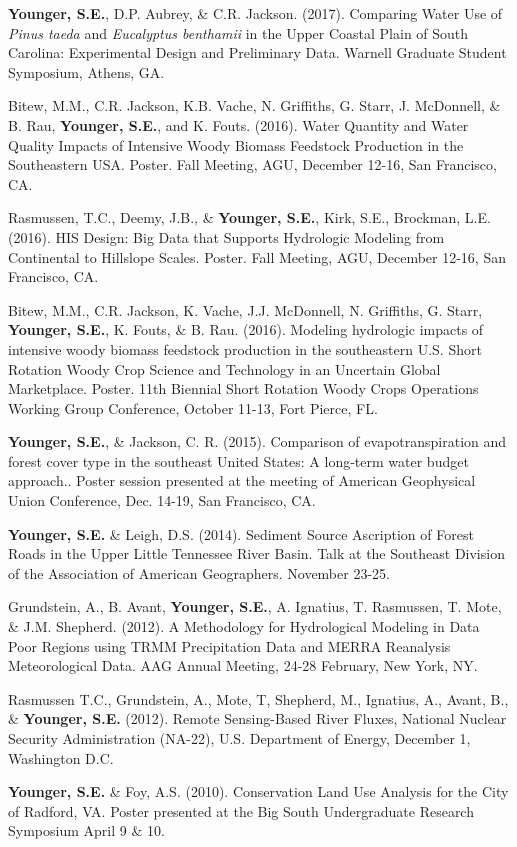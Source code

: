 \documentclass[10pt,letterpaper]{article}
\begin{document}
\begin{hangparas}{.25in}{1}
		\textbf{Younger, S.E.}, D.P. Aubrey, \& C.R. Jackson. (2017). Comparing Water Use of \textit{Pinus taeda} and \textit{Eucalyptus benthamii} in the Upper Coastal Plain of South Carolina: Experimental Design and Preliminary Data. Warnell Graduate Student Symposium, Athens, GA. 
		
		Bitew, M.M., C.R. Jackson, K.B. Vache, N. Griffiths, G. Starr, J. McDonnell, \& B. Rau, \textbf{Younger, S.E.}, and K. Fouts. (2016). Water Quantity and Water Quality Impacts of Intensive Woody Biomass Feedstock Production in the Southeastern USA. Poster. Fall Meeting, AGU, December 12-16, San Francisco, CA. 
		
		Rasmussen, T.C., Deemy, J.B., \& \textbf{Younger, S.E.}, Kirk, S.E., Brockman, L.E. (2016). HIS Design: Big Data that Supports Hydrologic Modeling from Continental to Hillslope Scales. Poster. Fall Meeting, AGU, December 12-16, San Francisco, CA. 
		
		Bitew, M.M., C.R. Jackson, K. Vache, J.J. McDonnell, N. Griffiths, G. Starr, \textbf{Younger, S.E.}, K. Fouts, \& B. Rau. (2016). Modeling hydrologic impacts of intensive woody biomass feedstock production in the southeastern U.S. Short Rotation Woody Crop Science and Technology in an Uncertain Global Marketplace. Poster. 11th Biennial Short Rotation Woody Crops Operations Working Group Conference, October 11-13, Fort Pierce, FL.
		
		\textbf{Younger, S.E.}, \& Jackson, C. R. (2015). Comparison of evapotranspiration and forest cover type in the southeast United States: A long-term water budget approach.. Poster session presented at the meeting of American Geophysical Union Conference, Dec. 14-19, San Francisco, CA.
		
		\textbf{Younger, S.E.} \& Leigh, D.S. (2014). Sediment Source Ascription of Forest Roads in the Upper Little Tennessee River Basin. Talk at the Southeast Division of the Association of American Geographers. November 23-25.
		
		Grundstein, A., B. Avant, \textbf{Younger, S.E.}, A. Ignatius, T. Rasmussen, T. Mote, \& J.M. Shepherd. (2012). A Methodology for Hydrological Modeling in Data Poor Regions using TRMM Precipitation Data and MERRA Reanalysis Meteorological Data. AAG Annual Meeting, 24-28 February, New York, NY.
		
		Rasmussen T.C., Grundstein, A., Mote, T, Shepherd, M., Ignatius, A., Avant, B., \& \textbf{Younger, S.E.} (2012). Remote Sensing-Based River Fluxes, National Nuclear Security Administration (NA-22), U.S. Department of Energy, December 1, Washington D.C.
		
		\textbf{Younger, S.E.} \& Foy, A.S. (2010). Conservation Land Use Analysis for the City of Radford, VA. Poster presented at the Big South Undergraduate Research Symposium April 9 \& 10.
		
	\end{hangparas}
	
\end{document}
